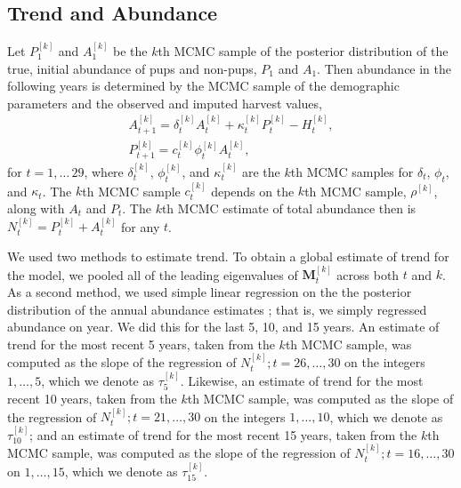 \documentclass[12pt, titlepage]{article}\usepackage[]{graphicx}\usepackage[]{color}
\def\bM{\mathbf{M}}
\begin{document}

\subsection{Trend and Abundance} \label{sec:trend}

Let $P_1^{[k]}$ and $A_1^{[k]}$ be the $k$th MCMC sample of the posterior distribution of the true, initial abundance of pups and non-pups, $P_1$ and $A_1$. Then abundance in the following years is determined by the MCMC sample of the demographic parameters and the observed and imputed harvest values,
\[
  \begin{array}{l}
    A^{[k]}_{t+1} = \delta^{[k]}_tA^{[k]}_t + \kappa^{[k]}_t P^{[k]}_t - H^{[k]}_t, \\
    P^{[k]}_{t+1} = c^{[k]}_t\phi^{[k]}_t A^{[k]}_t,
  \end{array}
\]
for $t = 1,\ldots\,29$, where $\delta_t^{[k]}$, $\phi_t^{[k]}$, and $\kappa_t^{[k]}$ are the $k$th MCMC samples for $\delta_t$, $\phi_t$, and $\kappa_t$. The $k$th MCMC sample $c^{[k]}_t$ depends on the $k$th MCMC sample, $\rho^{[k]}$, along with $A_t$ and $P_t$. The $k$th MCMC estimate of total abundance then is $N_t^{[k]} = P_t^{[k]} + A_t^{[k]}$ for any $t$.

We used two methods to estimate trend.  To obtain a global estimate of trend for the model, we pooled all of the leading eigenvalues of $\bM_t^{[k]}$ across both $t$ and $k$. As a second method, we used simple linear regression on the the posterior distribution of the annual abundance estimates \citep{John:Frit:agtr:2014}; that is, we simply regressed abundance on year.  We did this for the last 5, 10, and 15 years. An estimate of trend for the most recent 5 years, taken from the $k$th MCMC sample, was computed as the slope of the regression of $N^{[k]}_t;t=26,\ldots,30$ on the integers $1,\ldots,5$, which we denote as $\tau^{[k]}_5$.  Likewise, an estimate of trend for the most recent 10 years, taken from the $k$th MCMC sample, was computed as the slope of the regression of $N^{[k]}_t;t=21,\ldots,30$ on the integers $1,\ldots,10$, which we denote as $\tau^{[k]}_{10}$; and an estimate of trend for the most recent 15 years, taken from the $k$th MCMC sample, was computed as the slope of the regression of $N^{[k]}_t;t=16,\ldots,30$ on $1,\ldots,15$, which we denote as $\tau^{[k]}_{15}$.
\end{document}
